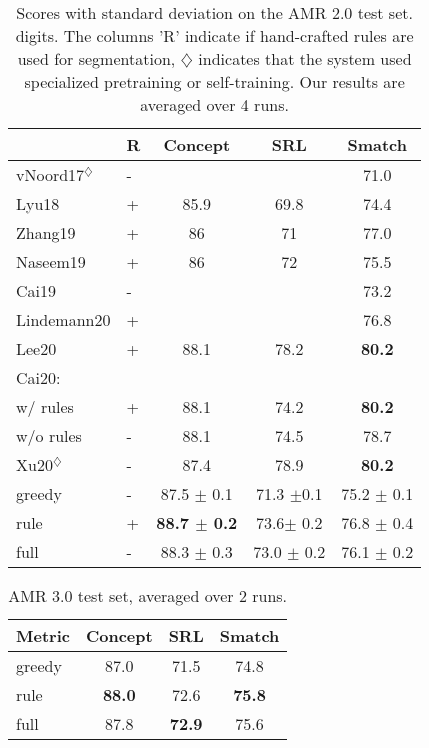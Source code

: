 \documentclass[11pt]{article}
\begin{document}
\begin{table}[t!] 
   \begin{center} \setlength\tabcolsep{3pt} 
          \begin{tabular}{llccc} 
   \hline   
          & R &   Concept & SRL &  Smatch  \\\hline
    vNoord17$^\diamondsuit$  & - &  &  & 71.0 \\      
    Lyu18 &  +   & 85.9  &69.8&74.4\\
  Zhang19  & +    & 86  &71& 77.0\\
   Naseem19  & +    & 86 &72&75.5\\
   Cai19 & - & &  &   73.2 \\
   Lindemann20  & +  &   & & 76.8\\
   Lee20  & +    & 88.1  &78.2 & \bf 80.2\\
 Cai20: \\ 
 \quad w/ rules & +   & 88.1 & 74.2& \bf80.2\\
 \quad w/o rules & -   & 88.1 & 74.5&  78.7\\
 Xu20$^\diamondsuit$  &  - & 87.4 & 78.9 & \bf 80.2  \\


     \hline
      greedy  & -   & 87.5   \small $ \pm$ 0.1& 71.3 \small $ \pm$0.1 & 75.2 \small $ \pm$ 0.1\\
     rule    & + & \bf 88.7 \small $ \pm$ 0.2  &  73.6\small $ \pm$ 0.2  & 76.8 \small $ \pm$ 0.4\\
  full     &  - &  88.3 \small $ \pm$ 0.3 & 73.0 \small $ \pm$ 0.2& 76.1 \small $ \pm$ 0.2\\ \hline
        \end{tabular}
    \end{center}
    \vspace{-2ex}
	\caption{\label{table:sota} Scores with standard deviation on the AMR 2.0 test set.  digits.  The columns 'R' indicate if hand-crafted rules are used for segmentation, $\diamondsuit$ indicates that the system used specialized pretraining or self-training.  Our results are averaged over 4 runs. }
\end{table}

\begin{table}[t!] 
   \begin{center} \setlength\tabcolsep{3pt} 
     \begin{tabular}{lccc} 
   \hline 
        Metric  &   Concept & SRL &  Smatch \\\hline
         greedy    &87.0& 71.5& 74.8 \\
        rule    & \bf 88.0 & 72.6 &\bf 75.8 \\
     full     &  87.8  &\bf 72.9 & 75.6 \\ \hline
        \end{tabular}
    \end{center}
    \vspace{-2ex}
	\caption{\label{table:sota3}  AMR 3.0 test set, averaged over 2 runs.
    }
\end{table}
\end{document}
